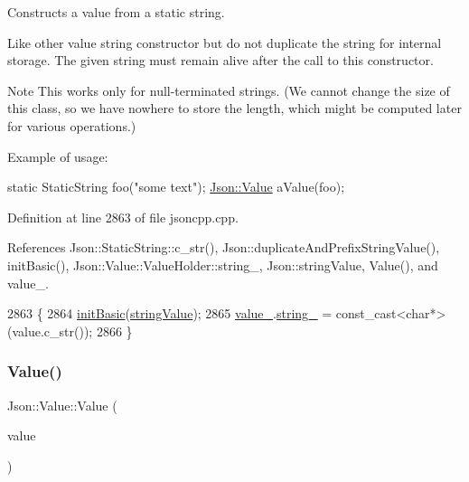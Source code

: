 Constructs a value from a static string. 

Like other value string constructor but do not duplicate the string for internal storage. The given string must remain alive after the call to this constructor. \begin{DoxyNote}{Note}
This works only for null-\/terminated strings. (We cannot change the size of this class, so we have nowhere to store the length, which might be computed later for various operations.)
\end{DoxyNote}
Example of usage\+: 
\begin{DoxyCode}
\textcolor{keyword}{static} StaticString foo(\textcolor{stringliteral}{"some text"});
\hyperlink{class_json_1_1_value}{Json::Value} aValue(foo);
\end{DoxyCode}
 

Definition at line 2863 of file jsoncpp.\+cpp.



References Json\+::\+Static\+String\+::c\+\_\+str(), Json\+::duplicate\+And\+Prefix\+String\+Value(), init\+Basic(), Json\+::\+Value\+::\+Value\+Holder\+::string\+\_\+, Json\+::string\+Value, Value(), and value\+\_\+.


\begin{DoxyCode}
2863                                       \{
2864   \hyperlink{class_json_1_1_value_a32b86b71564157f40f880f5736be822a}{initBasic}(\hyperlink{namespace_json_a7d654b75c16a57007925868e38212b4ea804ef857affea2d415843c73f261c258}{stringValue});
2865   \hyperlink{class_json_1_1_value_aef578244546212705b9f81eb84d7e151}{value\_}.\hyperlink{union_json_1_1_value_1_1_value_holder_a70ac2b153bc405527baa3850d2ddc3cb}{string\_} = \textcolor{keyword}{const\_cast<}\textcolor{keywordtype}{char}*\textcolor{keyword}{>}(value.c\_str());
2866 \}
\end{DoxyCode}
\mbox{\label{class_json_1_1_value_a89ef37969ff7c6eb3a7afcca03d4cd4a}} 
\subsubsection{\texorpdfstring{Value()}{Value()}\hspace{0.1cm}{\footnotesize\ttfamily [10/12]}}
{\footnotesize\ttfamily Json\+::\+Value\+::\+Value (\begin{DoxyParamCaption}\item[{const \hyperlink{json_8h_a1e723f95759de062585bc4a8fd3fa4be}{J\+S\+O\+N\+C\+P\+P\+\_\+\+S\+T\+R\+I\+NG} \&}]{value }\end{DoxyParamCaption})}



